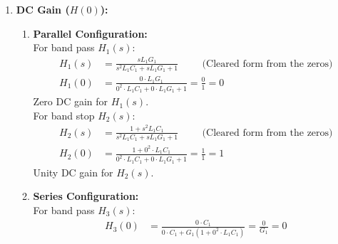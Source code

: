 \begin{enumerate}
\begin{enumerate}
\begin{align*}
            1 + s^2 L_1 C_1 &= 0 \hspace{1cm} \text{(Dividing by \(G_1 \neq 0\))} \\
            s^2 + \frac{1}{L_1 C_1} &= 0 \hspace{1cm} \text{(Dividing by \(L_1 C_1\))} \\
            s^2 &= -\frac{1}{L_1 C_1} \\
            s &= \pm j\sqrt{\frac{1}{L_1 C_1}} \quad \text{[let \(s = s_z\)]} \\
            f_z = \frac{|s_z|}{2\pi} = \frac{\sqrt{\frac{1}{L_1 C_1}}}{2\pi} = \frac{1}{2\pi \sqrt{L_1 C_1}}
          \end{align*}
         Zero at natural frequency for \(H_4(s)\) means the filter will have zero
         output which is what we expect.
    \end{enumerate}
  \item \textbf{DC Gain (\(H(0)\)):} \\
    \begin{enumerate}
    \item \textbf{Parallel Configuration:}\\
        For band pass \(H_1(s)\):
        \begin{align*}
          H_1(s) &= \frac{s L_1 G_1}{s^2 L_1 C_1 + s L_1 G_1 + 1} \hspace{1cm} \text{(Cleared form from the zeros)} \\
          H_1(0) &= \frac{0 \cdot L_1 G_1}{0^2 \cdot L_1 C_1 + 0 \cdot L_1 G_1 + 1} = \frac{0}{1} = 0
        \end{align*}
        Zero DC gain for \(H_1(s)\). \\
        For band stop \(H_2(s)\):
        \begin{align*}
          H_2(s) &= \frac{1 + s^2 L_1 C_1}{s^2 L_1 C_1 + s L_1 G_1 + 1} \hspace{1cm} \text{(Cleared form from the zeros)} \\
          H_2(0) &= \frac{1 + 0^2 \cdot L_1 C_1}{0^2 \cdot L_1 C_1 + 0 \cdot L_1 G_1 + 1} = \frac{1}{1} = 1
        \end{align*}
        Unity DC gain for \(H_2(s)\).
      \item \textbf{Series Configuration:}\\
        For band pass \(H_3(s)\):
        \begin{align*}
          H_3(0) &= \frac{0 \cdot C_1}{0 \cdot C_1 + G_1(1 + 0^2 \cdot L_1 C_1)} = \frac{0}{G_1} = 0
        \end{align*}

\end{enumerate}
\end{enumerate}
